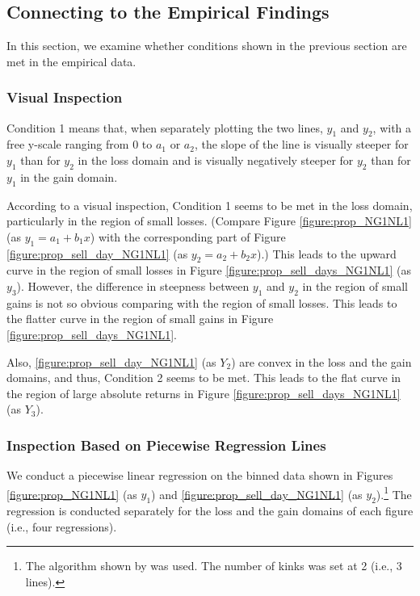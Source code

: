 \documentclass[11pt, a4paper]{article}
\begin{document}

\subsection{Connecting to the Empirical Findings}
\label{section:emp_cond}
In this section, we examine whether conditions shown in the previous section are met in the empirical data.

\subsubsection{Visual Inspection}
Condition 1 means that, when separately plotting the two lines, $y_1$ and $y_2$, with a free y-scale ranging from 0 to $a_1$ or $a_2$, the slope of the line is visually steeper for $y_1$ than for $y_2$ in the loss domain and is visually negatively steeper for $y_2$ than for $y_1$ in the gain domain. 

According to a visual inspection, Condition 1 seems to be met in the loss domain, particularly in the region of small losses. (Compare Figure \ref{figure:prop_NG1NL1} (as $y_1=a_1+b_1x$) with the corresponding part of Figure \ref{figure:prop_sell_day_NG1NL1} (as $y_2=a_2+b_2x$).) This leads to the upward curve in the region of small losses in Figure \ref{figure:prop_sell_days_NG1NL1} (as $y_3$).
However, the difference in steepness between $y_1$ and $y_2$ in the region of small gains is not so obvious comparing with the region of small losses. This leads to the flatter curve in the region of small gains in Figure \ref{figure:prop_sell_days_NG1NL1}.

Also, \ref{figure:prop_sell_day_NG1NL1} (as $Y_2$) are convex in the loss and the gain domains, and thus, Condition 2 seems to be met. This leads to the flat curve in the region of large absolute returns in Figure \ref{figure:prop_sell_days_NG1NL1} (as $Y_3$).

\subsubsection{Inspection Based on Piecewise Regression Lines}
We conduct a piecewise linear regression on the binned data shown in Figures \ref{figure:prop_NG1NL1} (as $y_1$) and \ref{figure:prop_sell_day_NG1NL1} (as $y_2$).\footnote{The algorithm shown by \citet{muggeo2008} was used. The number of kinks was set at 2 (i.e., 3 lines).} The regression is conducted separately for the loss and the gain domains of each figure (i.e., four regressions). 
\end{document}
